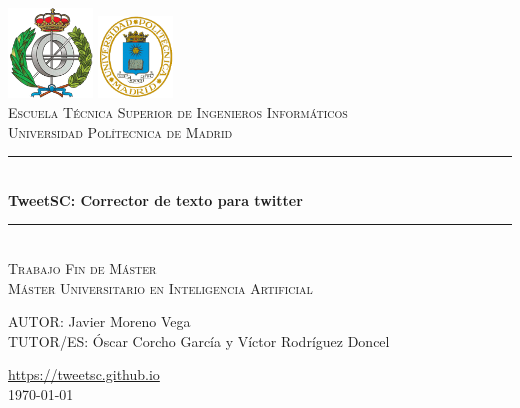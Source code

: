\documentclass[spanish,12pt, a4paper,twoside]{paper}
\begin{document}
\begin{titlepage}

\newcommand{\HRule}{\rule{\linewidth}{0.5mm}} %

\center %
 
\includegraphics[width=2.25cm]{recursos/logoFi.png}
  \hspace{8cm}
\includegraphics[width=2cm]{recursos/logoupm.png}
\\[1cm]

\textsc{\Large Escuela Técnica Superior de Ingenieros Informáticos}\\[0.5cm]
\textsc{\large Universidad Polítecnica de Madrid}
\\[3cm]


 \HRule \\[0.4cm]
{ \huge \bfseries TweetSC: Corrector de texto para twitter}\\[0.4cm] %
\HRule \\[2.5cm]

\textsc{\LARGE Trabajo Fin de Máster}\\[0.5cm] 
\textsc{\Large Máster Universitario en Inteligencia Artificial }\\[2.5cm]

\begin{flushright}
\large
AUTOR: Javier Moreno Vega\\
TUTOR/ES: Óscar Corcho García y \linebreak
                    Víctor Rodríguez Doncel
\end{flushright}


{{\url{https://tweetsc.github.io}}}\\[1cm]


{ {\today}}\\[1cm]

\vfill %

\end{titlepage}
\end{document}
